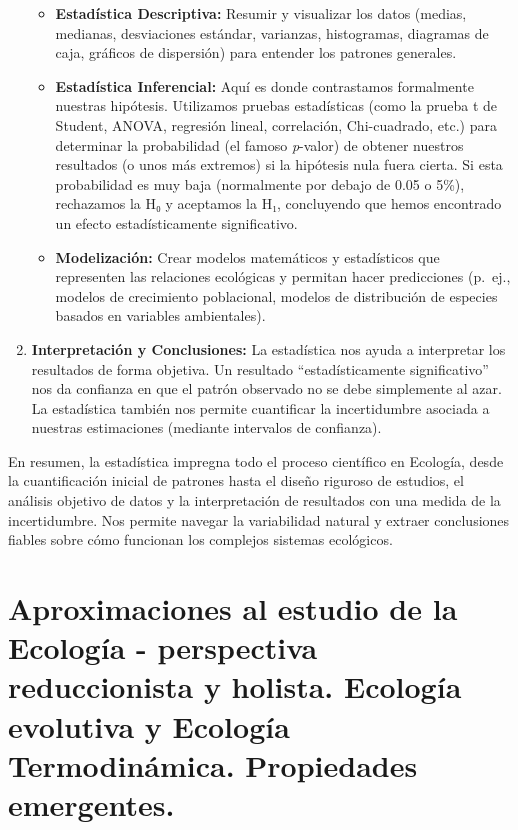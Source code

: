 \documentclass[
]{book}
\providecommand{\tightlist}{%
  \setlength{\itemsep}{0pt}\setlength{\parskip}{0pt}}
\begin{document}
\begin{enumerate}
  \begin{itemize}
  \tightlist
  \item
    \textbf{Estadística Descriptiva:} Resumir y visualizar los datos (medias, medianas, desviaciones estándar, varianzas, histogramas, diagramas de caja, gráficos de dispersión) para entender los patrones generales.
  \item
    \textbf{Estadística Inferencial:} Aquí es donde contrastamos formalmente nuestras hipótesis. Utilizamos pruebas estadísticas (como la prueba t de Student, ANOVA, regresión lineal, correlación, Chi-cuadrado, etc.) para determinar la probabilidad (el famoso \emph{p}-valor) de obtener nuestros resultados (o unos más extremos) si la hipótesis nula fuera cierta. Si esta probabilidad es muy baja (normalmente por debajo de 0.05 o 5\%), rechazamos la H₀ y aceptamos la H₁, concluyendo que hemos encontrado un efecto estadísticamente significativo.
  \item
    \textbf{Modelización:} Crear modelos matemáticos y estadísticos que representen las relaciones ecológicas y permitan hacer predicciones (p.~ej., modelos de crecimiento poblacional, modelos de distribución de especies basados en variables ambientales).
  \end{itemize}
\item
  \textbf{Interpretación y Conclusiones:} La estadística nos ayuda a interpretar los resultados de forma objetiva. Un resultado ``estadísticamente significativo'' nos da confianza en que el patrón observado no se debe simplemente al azar. La estadística también nos permite cuantificar la incertidumbre asociada a nuestras estimaciones (mediante intervalos de confianza).
\end{enumerate}

En resumen, la estadística impregna todo el proceso científico en Ecología, desde la cuantificación inicial de patrones hasta el diseño riguroso de estudios, el análisis objetivo de datos y la interpretación de resultados con una medida de la incertidumbre. Nos permite navegar la variabilidad natural y extraer conclusiones fiables sobre cómo funcionan los complejos sistemas ecológicos.

\section*{Aproximaciones al estudio de la Ecología - perspectiva reduccionista y holista. Ecología evolutiva y Ecología Termodinámica. Propiedades emergentes.}\label{aproximaciones}
\end{document}
